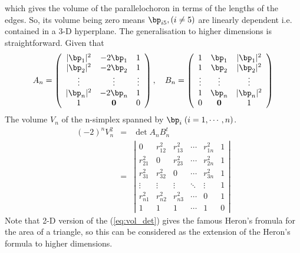 \documentclass{article}
\begin{document}
which gives the volume of the parallelochoron in terms of the lengths of the edges. So, its volume being zero means $\bp_{i5},(i\ne5)$ are linearly dependent i.e. contained in a 3-D hyperplane.
 The generalisation to higher dimensions is straightforward. Given that
\begin{equation}
\label{}
A_{n}  =   \left(\begin{array}{ccc}|\bp_1|^2 &  -2\bp_1 & 1 \\ |\bp_2|^2 &  -2\bp_2 & 1 \\ \vdots & \vdots & \vdots \\ |\bp_n|^2 & -2\bp_n & 1 \\ 1 & \textbf 0 & 0\end{array}\right), \quad
B_n  =  \left(\begin{array}{ccc} 1 &  \bp_1 & |\bp_1|^2 \\ 1 & \bp_2 & |\bp_2|^2 \\ \vdots & \vdots & \vdots \\ 1 & \bp_n & |\bp_n|^2 \\ 0 & \textbf 0 & 1\end{array}\right)
\end{equation}
The volume $V_{n}$ of the n-simplex spanned by $\bp_{i}\;(i=1,\cdots,n)$.
\begin{eqnarray}
(-2)^nV_n^2 &=& \det{A_{n}B_{n}^t} \\
&=& \left|\begin{array}{cccccc}
0        & r_{12}^2 &r_{13}^2   & \cdots  & r_{1n}^{2} & 1 \\
r_{21}^2 & 0        & r_{23}^2  & \cdots  & r_{2n}^{2} & 1 \\
r_{31}^2 & r_{32}^2 & 0         & \cdots  & r_{3n}^{2} & 1 \\
\vdots   & \vdots   & \vdots    & \ddots  & \vdots     & 1 \\
r_{n1}^2 & r_{n2}^2 & r_{n3}^{2}& \cdots  & 0          & 1 \\
1        & 1        & 1         & \cdots  & 1      & 0
\end{array}\right|
\end{eqnarray}
Note that 2-D version of the (\ref{eq:vol_det}) gives the famous Heron's fromula for the area of a triangle, so this can be considered as the extension of the Heron's formula to higher dimensions.
\end{document}
